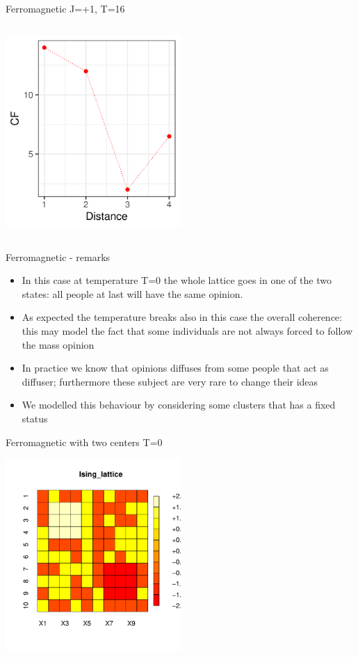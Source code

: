\documentclass{beamer}
\begin{document}
\begin{frame}{Ferromagnetic J=+1, T=16}
\begin{columns}
\begin{column}{0.5\textwidth}
\begin{center}
     \end{center}
         \begin{center}
     \includegraphics[width=0.5\textwidth]{Pic/J+1_10_2500_T=16_Coherence.pdf}
     \end{center}
\end{column}
\end{columns}
\end{frame}


\begin{frame}{Ferromagnetic - remarks}
\begin{itemize}
\item In this case at temperature T=0 the whole lattice goes in one of the two states: all people at last will have the same opinion. 
\item As expected the temperature breaks also in this case the overall coherence: this may model the fact that some individuals are not always forced to follow the mass opinion
\item In practice we know that opinions diffuses from some people that act as diffuser; furthermore these subject are very rare to change their ideas
\item We modelled this behaviour by considering some clusters that has a fixed status
\end{itemize}
\end{frame}

\begin{frame}{Ferromagnetic with two centers T=0}
    \begin{center}
     \includegraphics[width=0.5\textwidth]{Pic/2CENTER.pdf}
     \end{center}
\end{frame}
\end{document}
